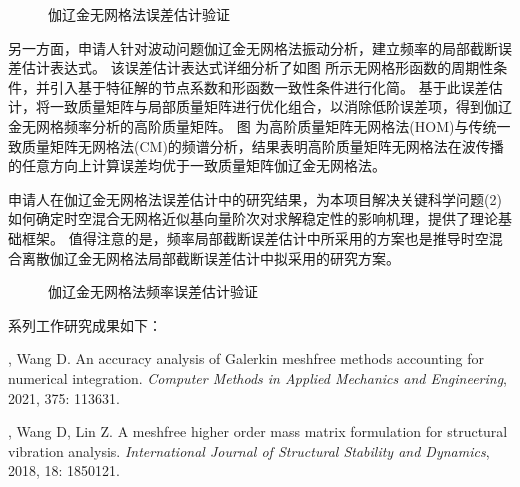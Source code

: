 \begin{figure}[!h]
    \centering 
    \caption{伽辽金无网格法误差估计验证}
    \label{fg:cube}
\end{figure}

另一方面，申请人针对波动问题伽辽金无网格法振动分析，建立频率的局部截断误差估计表达式。
该误差估计表达式详细分析了如图  所示无网格形函数的周期性条件，并引入基于特征解的节点系数和形函数一致性条件进行化简。
基于此误差估计，将一致质量矩阵与局部质量矩阵进行优化组合，以消除低阶误差项，得到伽辽金无网格频率分析的高阶质量矩阵。
图  为高阶质量矩阵无网格法(HOM)与传统一致质量矩阵无网格法(CM)的频谱分析，结果表明高阶质量矩阵无网格法在波传播的任意方向上计算误差均优于一致质量矩阵伽辽金无网格法。

申请人在伽辽金无网格法误差估计中的研究结果，为本项目解决关键科学问题(2)如何确定时空混合无网格近似基向量阶次对求解稳定性的影响机理，提供了理论基础框架。
值得注意的是，频率局部截断误差估计中所采用的方案也是推导时空混合离散伽辽金无网格法局部截断误差估计中拟采用的研究方案。

\begin{figure}[!h]
    \centering 
    \caption{伽辽金无网格法频率误差估计验证}
    \label{fg:frequency}
\end{figure}


系列工作研究成果如下：

\vspace{-50pt}
\begin{thebibliography}{1}
	, Wang D.
	\newblock An accuracy analysis of {{Galerkin}} meshfree methods accounting for
	  numerical integration.
	\newblock \emph{Computer Methods in Applied Mechanics and Engineering}, 2021,
	  375: 113631.

	, Wang D, Lin Z.
	\newblock A meshfree higher order mass matrix formulation for structural
	  vibration analysis.
	\newblock \emph{International Journal of Structural Stability and Dynamics},
	  2018, 18: 1850121.

\end{thebibliography}


